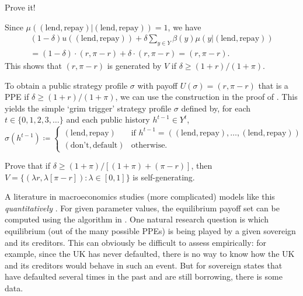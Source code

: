 \begin{exercise}
	\label{exercise:sovereign_enforcement}
	Prove it!
\end{exercise}

\noindent
Since $\mu((\text{lend},\text{repay})|(\text{lend},\text{repay})) = 1$, we have
%
\begin{multline*}
	(1-\delta) u((\text{lend},\text{repay}))
	+ \delta \sum_{y \in Y} \beta(y) \mu(y|(\text{lend},\text{repay}))
	\\
	= (1-\delta) \cdot (r,\pi-r)
	+ \delta \cdot (r,\pi-r)
	= (r,\pi-r) .
\end{multline*}
%
This shows that $(r,\pi-r)$ is generated by $V$ if $\delta \geq (1+r)/(1+\pi)$.

To obtain a public strategy profile $\sigma$ with payoff $U(\sigma)=(r,\pi-r)$ that is a PPE if $\delta \geq (1+r)/(1+\pi)$, we can use the construction in the proof of . This yields the simple `grim trigger' strategy profile $\sigma$ defined by, for each $t \in \{0,1,2,3,\dots\}$ and each public history $h^{t-1} \in Y^t$,
%
\begin{equation*}
	\sigma\left( h^{t-1} \right) \coloneqq
	\begin{cases}
		(\text{lend},\text{repay}) & \text{if $h^{t-1} = ( (\text{lend},\text{repay}), \dots, (\text{lend},\text{repay}) )$} \\
		(\text{don't},\text{default}) & \text{otherwise.}
	\end{cases}
\end{equation*}

\begin{exercise}
	\label{exercise:sovereign_selfgen}
	Prove that if $\delta \geq (1+\pi)/[(1+\pi)+(\pi-r)]$, then $V = \{ (\lambda r, \lambda[\pi-r]) : \lambda \in [0,1] \}$ is self-generating.
\end{exercise}

A literature in macroeconomics studies (more complicated) models like this \emph{quantitatively} \parencite[see][]{AguiarAmador2021}. For given parameter values, the equilibrium payoff set can be computed using the algorithm in . One natural research question is which equilibrium (out of the many possible PPEs) is being played by a given sovereign and its creditors. This can obviously be difficult to assess empirically: for example, since the UK has never defaulted, there is no way to know how the UK and its creditors would behave in such an event. But for sovereign states that have defaulted several times in the past and are still borrowing, there is some data.



